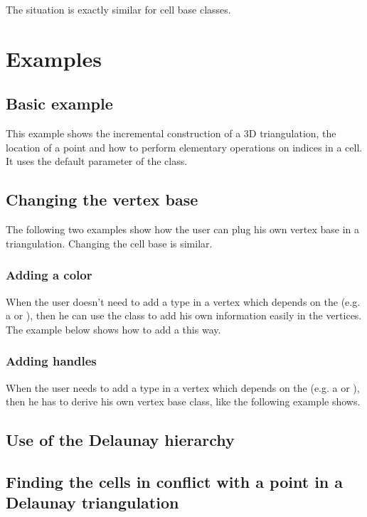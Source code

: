 The situation is exactly similar for cell base classes.

\section{Examples}
\label{Triangulation3-sec-examples}
\subsection{Basic example}
This example shows the incremental construction of a 3D triangulation, the
location of a point and how to perform elementary operations on indices in a
cell. It uses the default parameter of the  class.


\subsection{Changing the vertex base}
The following two examples show how the user can plug his own vertex base in a
triangulation.  Changing the cell base is similar.

\subsubsection{Adding a color}
When the user doesn't need to add a type in a vertex which depends on the
 (e.g. a  or
), then he can use the
 class to add his own information
easily in the vertices.  The example below shows how to add a 
this way.


\subsubsection{Adding handles}
When the user needs to add a type in a vertex which depends on the
 (e.g. a  or
), then he has to derive his own vertex base class,
like the following example shows.


\subsection{Use of the Delaunay hierarchy}


\subsection{Finding the cells in conflict with a point in a Delaunay
triangulation}


